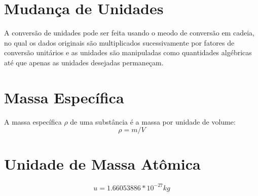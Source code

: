 \documentclass[12pt,a4paper]{article}
\begin{document}
    \section*{Mudança de Unidades}
    A conversão de unidades pode ser feita usando o meodo de conversão em cadeia, no qual os dados originais são multiplicados sucessivamente por fatores de conversão unitários e as unidades são manipuladas como quantidades algébricas até que apenas as unidades desejadas permaneçam.
    \section*{Massa Específica}
    A massa específica $\rho$ de uma substância é a massa por unidade de volume:
    \begin{equation}
        \rho = m/V
    \end{equation}
    \section*{Unidade de Massa Atômica}
    \begin{equation}
        u=1.66053886 * 10^{-27}kg
    \end{equation}
\end{document}
